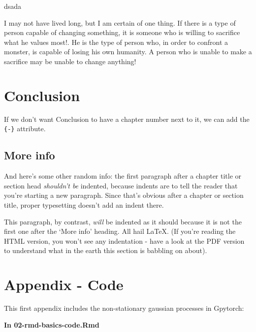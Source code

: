 \documentclass[a4paper, nobind]{templates/cdethesis}
\begin{document}
dsada

\begin{savequote}
I may not have lived long, but I am certain of one thing. If there is a
type of person capable of changing something, it is someone who is
willing to sacrifice what he values most!. He is the type of person who,
in order to confront a monster, is capable of losing his own humanity. A
person who is unable to make a sacrifice may be unable to change
anything!
\end{savequote}



\hypertarget{conclusion-1}{%
\chapter*{Conclusion}\label{conclusion-1}}

If we don't want Conclusion to have a chapter number next to it, we can add the \texttt{\{-\}} attribute.

\hypertarget{more-info}{%
\section*{More info}\label{more-info}}

And here's some other random info:
the first paragraph after a chapter title or section head \emph{shouldn't be} indented, because indents are to tell the reader that you're starting a new paragraph.
Since that's obvious after a chapter or section title, proper typesetting doesn't add an indent there.

This paragraph, by contrast, \emph{will} be indented as it should because it is not the first one after the `More info' heading.
All hail LaTeX. (If you're reading the HTML version, you won't see any indentation - have a look at the PDF version to understand what in the earth this section is babbling on about).

\startappendices

\hypertarget{appendix---code}{%
\chapter{Appendix - Code}\label{appendix---code}}

This first appendix includes the non-stationary gaussian processes in Gpytorch:

\textbf{In 02-rmd-basics-code.Rmd}
\end{document}
